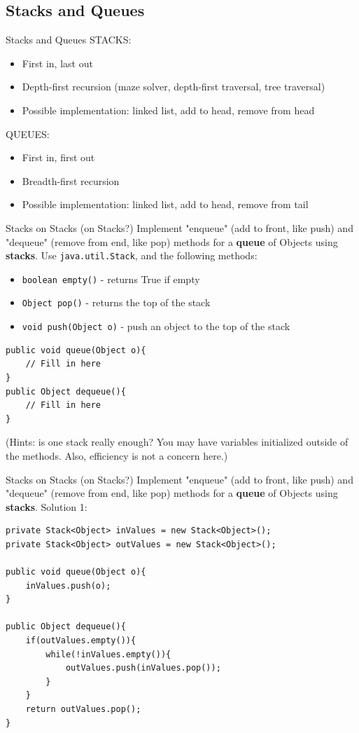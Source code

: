 \documentclass[9pt]{beamer}
\begin{document}
\subsection{Stacks and Queues}

\begin{frame}[fragile]{\Huge{Stacks and Queues}}
STACKS:
\begin{itemize}
\item First in, last out
\item Depth-first recursion (maze solver, depth-first traversal, tree traversal)
\item Possible implementation: linked list, add to head, remove from head
\end{itemize}
QUEUES:
\begin{itemize}
\item First in, first out
\item Breadth-first recursion
\item Possible implementation: linked list, add to head, remove from tail
\end{itemize}
\end{frame}

\begin{frame}[fragile]{\Huge{Stacks on Stacks (on Stacks?)}}
Implement "enqueue" (add to front, like push) and "dequeue" (remove from end, like pop) methods for a \textbf{queue} of Objects using \textbf{stacks}. Use {\tt java.util.Stack}, and the following methods:
\begin{itemize}
\item {\tt boolean empty()} - returns True if empty
\item {\tt Object pop()} - returns the top of the stack
\item {\tt void push(Object o)} - push an object to the top of the stack
\end{itemize}
\begin{lstlisting}
public void queue(Object o){
    // Fill in here
}
public Object dequeue(){
    // Fill in here
}
\end{lstlisting}
(Hints: is one stack really enough? You may have variables initialized outside of the methods. Also, efficiency is not a concern here.)
\end{frame}

\begin{frame}[fragile]{\Huge{Stacks on Stacks (on Stacks?)}}
Implement "enqueue" (add to front, like push) and "dequeue" (remove from end, like pop) methods for a \textbf{queue} of Objects using \textbf{stacks}. Solution 1:
\begin{lstlisting}
private Stack<Object> inValues = new Stack<Object>();
private Stack<Object> outValues = new Stack<Object>();

public void queue(Object o){
    inValues.push(o);
}

public Object dequeue(){
    if(outValues.empty()){
        while(!inValues.empty()){
            outValues.push(inValues.pop());
        }
    }
    return outValues.pop();
}
\end{lstlisting}
\end{frame}
\end{document}
